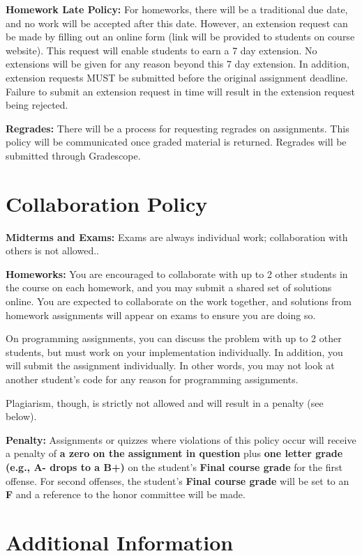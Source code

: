 \documentclass[12pt]{article}
\begin{document}
\textbf{Homework Late Policy:} For homeworks, there will be a traditional due date, and no work will be accepted after this date. However, an extension request can be made by filling out an online form (link will be provided to students on course website). This request will enable students to earn a 7 day extension. No extensions will be given for any reason beyond this 7 day extension. In addition, extension requests MUST be submitted before the original assignment deadline. Failure to submit an extension request in time will result in the extension request being rejected.

\textbf{Regrades:} There will be a process for requesting regrades on assignments. This policy will be communicated once graded material is returned. Regrades will be submitted through Gradescope.

\section*{Collaboration Policy}

\textbf{Midterms and Exams:} Exams are always individual work; collaboration with others is not allowed..

\textbf{Homeworks:} You are encouraged to collaborate with up to 2 other students in the course on each homework, and you may submit a shared set of solutions online. You are expected to collaborate on the work together, and solutions from homework assignments will appear on exams to ensure you are doing so.

On programming assignments, you can discuss the problem with up to 2 other students, but must work on your implementation individually. In addition, you will submit the assignment individually. In other words, you may not look at another student's code for any reason for programming assignments.

Plagiarism, though, is strictly not allowed and will result in a penalty (see below).

\textbf{Penalty:} Assignments or quizzes where violations of this policy occur will receive a penalty of \textbf{a zero on the assignment in question} plus \textbf{one letter grade (e.g., A- drops to a B+)} on the student's \textbf{Final course grade} for the first offense. For second offenses, the student's \textbf{Final course grade} will be set to an \textbf{F} and a reference to the honor committee will be made.

\section*{Additional Information}
\end{document}
